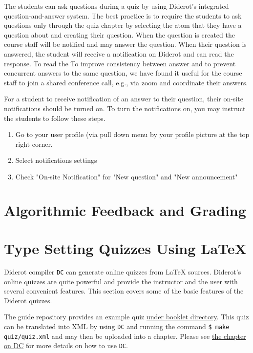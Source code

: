 The students can ask questions during a quiz by using Diderot's
integrated question-and-answer system.
%
The best practice is to require the students to ask questions only
through the quiz chapter by selecting the atom that they have a
question about and creating their question.
%
When the question is created the course staff will be notified and may answer the question. 
%
When their question is answered, the student will receive a notification on Diderot and can read the response.
%
To read the 
%
To improve consistency between answer and to prevent concurrent answers to the same question, we have found it useful for the course staff to join a shared conference call, e.g., via zoom and coordinate their answers. 

\begin{gram} 
For a student to receive notification of an answer to their question,
their on-site notifications should be turned on.  
%
To turn the notifications on, you may instruct the students to follow
these steps.
\begin{enumerate}
\item  Go to your user profile (via pull down menu by your profile picture at the top right corner. 

\item Select notifications settings

\item Check "On-site Notification" for "New question" and "New announcement"
\end{enumerate}
\end{gram}


\section{Algorithmic Feedback and Grading}

\section{Type Setting Quizzes Using LaTeX}
\label{ch:quiz::typesetting}

\begin{gram}
Diderot compiler \lstinline`DC` can generate online quizzes from LaTeX sources. Diderot’s online quizzes are quite powerful and provide the instructor and the user with several convenient features. This section covers some of the basic features of the Diderot quizzes.  

The guide repository provides an example quiz 
\href{https://github.com/diderot-edu/diderot-guide/tree/master/booklet}{under booklet directory}. 
%
This quiz can be translated into XML by using \lstinline`DC` and running the command 
%
\lstinline`$ make quiz/quiz.xml`
%
and may then be uploaded into a chapter. 
%
Please see \href{ch:dc}{the chapter on DC} for more details on how to use \lstinline`DC`.
\end{gram}

